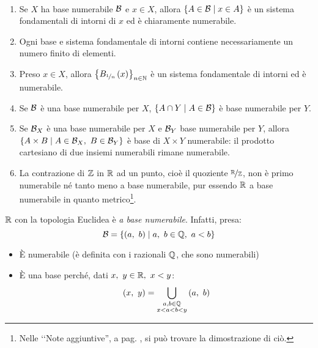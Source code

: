 \begin{demonstration}~{}
\begin{enumerate}[label=\Roman*]
	\item Se $X$ ha base numerabile $\mathcal{B}$ e $x\in X$, allora $\left\{A\in \mathcal{B}\mid x\in A\right\}$ è un sistema fondamentali di intorni di $x$ ed è chiaramente numerabile.
	\item Ogni base e sistema fondamentale di intorni contiene necessariamente un numero finito di elementi.
	\item Preso $x\in X$, allora $\left\{B_{\nicefrac{1}{n}}\left(x\right)\right\}_{n\in\mathbb{N}}$ è un sistema fondamentale di intorni ed è numerabile.
	\item Se $\mathcal{B}$ è una base numerabile per $X$, $\left\{A\cap Y\mid A\in \mathcal{B}\right\}$ è base numerabile per $Y$.
	\item Se $\mathcal{B}_X$ è una base numerabile per $X$ e $\mathcal{B}_Y$ base numerabile per $Y$, allora $\left\{A\times B\mid A\in \basis_X,\ B\in\basis_Y\right\}$ è base di $X\times Y$ numerabile: il prodotto cartesiano di due insiemi numerabili rimane numerabile.
	\item La contrazione di $\mathbb{Z}$ in $\mathbb{R}$ ad un punto, cioè il quoziente $\nicefrac{\mathbb{R}}{\mathbb{Z}}$, non è primo numerabile né tanto meno a base numerabile, pur essendo $\mathbb{R}$ a base numerabile in quanto metrico\footnote{Nelle ‘‘Note aggiuntive'', a pag. \pageref{dimostrazionenonnumerabilità}, si può trovare la dimostrazione di ciò.}.
\end{enumerate}
\vspace{-3mm}
\end{demonstration}
\begin{example}
	$\mathbb{R}$ con la topologia Euclidea è \textit{a base numerabile}. Infatti, presa:
	\begin{equation*}
		\mathcal{B}=\left\{\left(a,\ b\right)\mid a,\ b\in \mathbb{Q},\ a<b\right\}
	\end{equation*}
	\begin{itemize}
		\item È numerabile (è definita con i razionali $\mathbb{Q}$, che sono numerabili)
		\item È una base perché, dati $x,\ y\in\realset,\ x<y$:
		\begin{equation*}
			\left(x,\ y\right)=\union_{\substack{a, b\in\rationalset\\x<a<b<y}}\left(a,\ b\right)
		\end{equation*}
	\end{itemize}
\vspace{-6mm}
\end{example}

